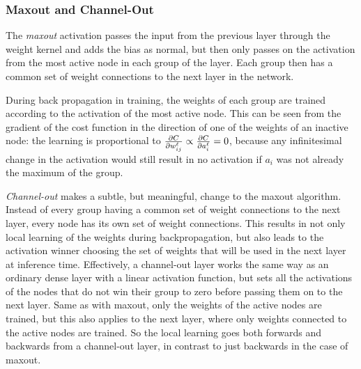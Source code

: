     \subsubsection{Maxout and Channel-Out}
        The \textit{maxout} activation passes the input from the previous layer through the weight kernel and adds the bias as normal, but then only passes on the activation from the most active node in each group of the layer. Each group then has a common set of weight connections to the next layer in  the network.

        During back propagation in training, the weights of each group are trained according to the activation of the most active node. This can be seen from the gradient of the cost function in the direction of one of the weights of an inactive node: the learning is proportional to $\pd[w^{\ell}_{ij}]{C} \propto \pd[a^\ell_i]{C} = 0$, because any infinitesimal change in the activation would still result in no activation if $a_i$ was not already the maximum of the group.



        \textit{Channel-out} makes a subtle, but meaningful, change to the maxout algorithm. Instead of every group having a common set of weight connections to the next layer, every node has its own set of weight connections. This results in not only local learning of the weights during backpropagation, but also leads to the activation winner choosing the set of weights that will be used in the next layer at inference time.
        Effectively, a channel-out layer works the same way as an ordinary dense layer with a linear activation function, but sets all the activations of the nodes that do not win their group to zero before passing them on to the next layer.
        Same as with maxout, only the weights of the active nodes are trained, but this also applies to the next layer, where only weights connected to the active nodes are trained. So the local learning goes both forwards and backwards from a channel-out layer, in contrast to just backwards in the case of maxout.

